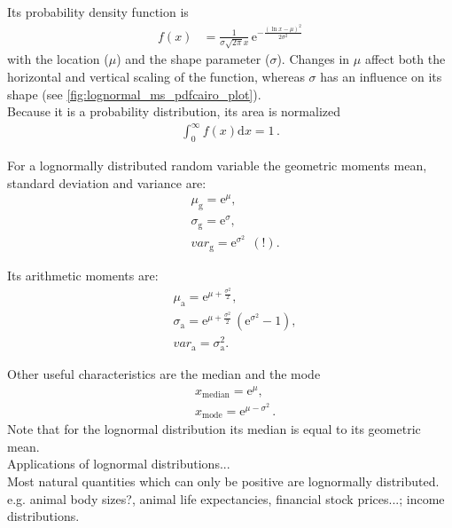 Its probability density function is
\begin{align}
	f(x) &= \frac{1}{\sigma \sqrt{2 \pi} x} \, \text{e}^{- \frac{(\ln x - \mu)^2}{2 \sigma^2}}
\end{align}
with the location ($\mu$) and the shape parameter ($\sigma$). Changes in $\mu$ affect both the horizontal and vertical scaling of the function, whereas $\sigma$ has an influence on its shape (see \autoref{fig:lognormal_ms_pdfcairo_plot}).\\

Because it is a probability distribution, its area is normalized
\begin{align}
	\int_0^\infty f(x) \text{d} x = 1\,.
\end{align}

For a lognormally distributed random variable the geometric moments mean, standard deviation and variance are:
\begin{align*}
	&\mu_\text{g} = \text{e}^\mu ,\\
	&\sigma_\text{g} = \text{e}^\sigma ,\\
	&var_\text{g} = \text{e}^{\sigma^2}~~(!) .
\end{align*}

Its arithmetic moments are:
\begin{align*}
	&\mu_\text{a} = \text{e}^{\mu + \frac{\sigma^2}{2}} ,\\
	&\sigma_\text{a} = \text{e}^{\mu + \frac{\sigma^2}{2}} \, \left(\text{e}^{\sigma^2} - 1\right) ,\\
	&var_\text{a} = \sigma_\text{a}^2 .
\end{align*}

Other useful characteristics are the median and the mode
\begin{align*}
	&x_\text{median} = \text{e}^{\mu},\\
	&x_\text{mode} = \text{e}^{\mu - \sigma^2}\,.
\end{align*}
Note that for the lognormal distribution its median is equal to its geometric mean.\\

Applications of lognormal distributions...\\

Most natural quantities which can only be positive are lognormally distributed. e.g. animal body sizes?, animal life expectancies, financial stock prices...; income distributions.\\

